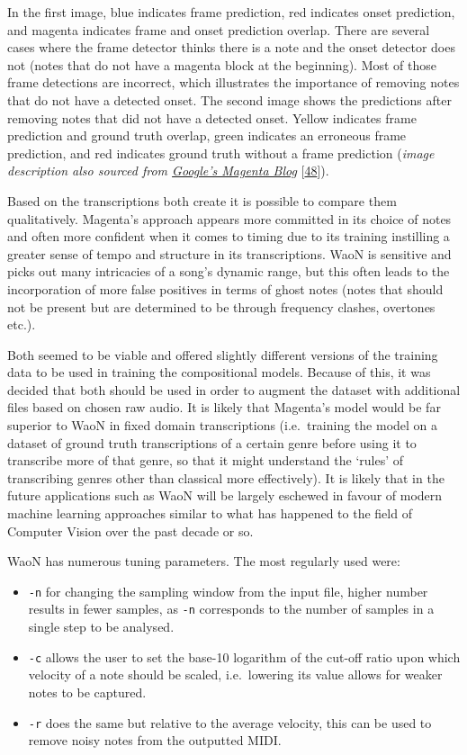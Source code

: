 \documentclass[12pt,]{article}
\providecommand{\tightlist}{%
  \setlength{\itemsep}{0pt}\setlength{\parskip}{0pt}}
\begin{document}
In the first image, blue indicates frame prediction, red indicates onset
prediction, and magenta indicates frame and onset prediction overlap.
There are several cases where the frame detector thinks there is a note
and the onset detector does not (notes that do not have a magenta block
at the beginning). Most of those frame detections are incorrect, which
illustrates the importance of removing notes that do not have a detected
onset. The second image shows the predictions after removing notes that
did not have a detected onset. Yellow indicates frame prediction and
ground truth overlap, green indicates an erroneous frame prediction, and
red indicates ground truth without a frame prediction
(\textit{image description also sourced from \href{https://magenta.tensorflow.org/onsets-frames}{Google's Magenta Blog}}
{[}\protect\hyperlink{ref-onsetsblog}{48}{]}).

Based on the transcriptions both create it is possible to compare them
qualitatively. Magenta's approach appears more committed in its choice
of notes and often more confident when it comes to timing due to its
training instilling a greater sense of tempo and structure in its
transcriptions. WaoN is sensitive and picks out many intricacies of a
song's dynamic range, but this often leads to the incorporation of more
false positives in terms of ghost notes (notes that should not be
present but are determined to be through frequency clashes, overtones
etc.).

Both seemed to be viable and offered slightly different versions of the
training data to be used in training the compositional models. Because
of this, it was decided that both should be used in order to augment the
dataset with additional files based on chosen raw audio. It is likely
that Magenta's model would be far superior to WaoN in fixed domain
transcriptions (i.e.~training the model on a dataset of ground truth
transcriptions of a certain genre before using it to transcribe more of
that genre, so that it might understand the `rules' of transcribing
genres other than classical more effectively). It is likely that in the
future applications such as WaoN will be largely eschewed in favour of
modern machine learning approaches similar to what has happened to the
field of Computer Vision over the past decade or so.

WaoN has numerous tuning parameters. The most regularly used were:

\begin{itemize}
\tightlist
\item
  \texttt{-n} for changing the sampling window from the input file,
  higher number results in fewer samples, as \texttt{-n} corresponds to
  the number of samples in a single step to be analysed.
\item
  \texttt{-c} allows the user to set the base-10 logarithm of the
  cut-off ratio upon which velocity of a note should be scaled,
  i.e.~lowering its value allows for weaker notes to be captured.
\item
  \texttt{-r} does the same but relative to the average velocity, this
  can be used to remove noisy notes from the outputted MIDI.
\end{itemize}
\end{document}
